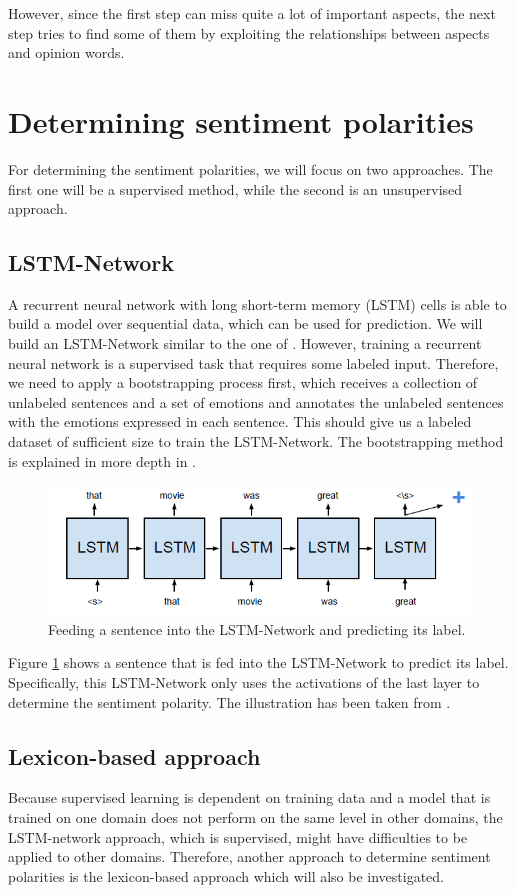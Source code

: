 \documentclass[10pt,a4paper]{article}
\begin{document}
	However, since the first step can miss quite a lot of important aspects, the next step tries to find some of them by exploiting the relationships between aspects and opinion words.
	
	\section{Determining sentiment polarities}
	For determining the sentiment polarities, we will focus on two approaches. The first one will be a supervised method, while the second is an unsupervised approach.
	
		\subsection{LSTM-Network}
		\label{sec:lstm}
		A recurrent neural network with long short-term memory (LSTM) cells is able to build a model over sequential data, which can be used for prediction. We will build an LSTM-Network similar to the one of \cite{hongsentiment}. However, training a recurrent neural network is a supervised task that requires some labeled input. Therefore, we need to apply a bootstrapping process first, which receives a collection of unlabeled sentences and a set of emotions and annotates the unlabeled sentences with the emotions expressed in each sentence. This should give us a labeled dataset of sufficient size to train the LSTM-Network. The bootstrapping method is explained in more depth in \cite{bootstrapping}.
		
		\begin{figure}[h]
			\centering
			\includegraphics[width=0.7\linewidth]{data/lstm}
			\caption{Feeding a sentence into the LSTM-Network and predicting its label.}
			\label{fig:lstm}
		\end{figure}
		
		Figure \ref{fig:lstm} shows a sentence that is fed into the LSTM-Network to predict its label. Specifically, this LSTM-Network only uses the activations of the last layer to determine the sentiment polarity. The illustration has been taken from \cite{hongsentiment}.
		
		\subsection{Lexicon-based approach}
		Because supervised learning is dependent on training data and a model that is trained on one domain does not perform on the same level in other domains, the LSTM-network approach, which is supervised, might have difficulties to be applied to other domains. Therefore, another approach to determine sentiment polarities is the lexicon-based approach which will also be investigated.
		
\end{document}
